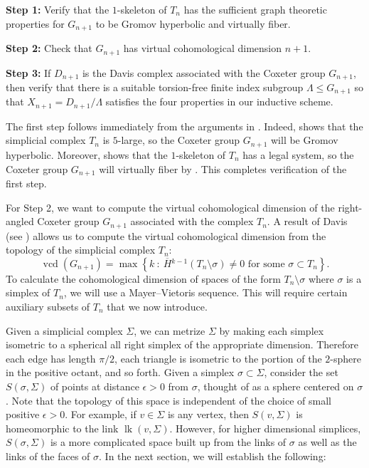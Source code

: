 \documentclass[12pt, letterpaper]{article}
\newcommand{\lk}{\operatorname{lk}}
\newcommand{\vcd}{\operatorname{vcd}}
\theoremstyle{plain}
\theoremstyle{definition}
\begin{document}
\bigskip

\noindent \textbf{Step 1:} Verify that the $1$-skeleton of $T_n$ has the sufficient graph theoretic properties for $G_{n+1}$ to be Gromov hyperbolic and virtually fiber.

\bigskip

\noindent \textbf{Step 2:} Check that $G_{n+1}$ has virtual cohomological dimension $n+1$.

\bigskip

\noindent \textbf{Step 3:} If
$D_{n+1}$ is the Davis complex associated with the Coxeter group $G_{n+1}$, then verify that there is a suitable torsion-free finite index subgroup $\Lambda \leq G_{n+1}$ so that $X_{n+1}=D_{n+1}/\Lambda$ satisfies the four properties in our inductive scheme.

\bigskip

The first step follows immediately from the arguments in . Indeed,  shows that the simplicial complex $T_n$ is $5$-large, so the Coxeter group $G_{n+1}$ will be Gromov hyperbolic. Moreover,  shows that the $1$-skeleton of $T_n$ has a legal system, so the Coxeter group $G_{n+1}$ will virtually fiber by \cite[Thm.\ 6.14]{JNW}. This completes verification of the first step.

For Step 2, we want to compute the virtual cohomological dimension of the right-angled Coxeter group $G_{n+1}$ associated with the complex $T_n$. A result of Davis (see \cite[Cor.\ 8.5.5]{Davis}) allows us to compute the virtual cohomological dimension from the topology of the simplicial complex $T_n$:
\begin{equation}\label{eqn:vcd def}
    \vcd(G_{n+1})= \max\!\left\{k\ :\ \overline{H}{}^{k-1}(T_n\setminus \sigma)\neq 0 \textrm{ for some } \sigma \subset T_n\right\}\!.
\end{equation}
To calculate the cohomological dimension of spaces of the form $T_n\setminus \sigma$ where $\sigma$ is a simplex of $T_n$, we will use a Mayer--Vietoris sequence. This will require certain auxiliary subsets of $T_n$ that we now introduce.

Given a simplicial complex $\Sigma$, we can metrize $\Sigma$ by making each simplex isometric to a spherical all right simplex of the appropriate dimension. Therefore each edge has length $\pi/2$, each triangle is isometric to the portion of the $2$-sphere in the positive octant, and so forth. Given a simplex $\sigma\subset \Sigma$, consider the set $S(\sigma, \Sigma)$ of points at distance $\epsilon>0$ from $\sigma$, thought of as a sphere centered on $\sigma$. Note that the topology of this space is independent of the choice of small positive $\epsilon>0$. For example, if $v\in \Sigma$ is any vertex, then $S(v, \Sigma)$ is homeomorphic to the link $\lk(v,\Sigma)$. However, for higher dimensional simplices, $S(\sigma, \Sigma)$ is a more complicated space built up from the links of $\sigma$ as well as the links of the faces of $\sigma$. In the next section, we will establish the following:
\end{document}
